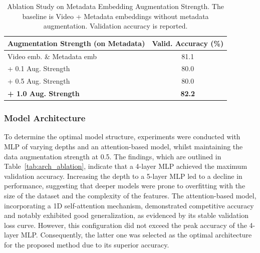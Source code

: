 \begin{table}[hbt!]
\centering
\caption{Ablation Study on Metadata Embedding Augmentation Strength. The baseline is Video + Metadata embeddings without metadata augmentation. Validation accuracy is reported.}
\label{tab:metadata_aug_ablation}
\small
\begin{tabular}{lc}
\toprule
Augmentation Strength (on Metadata) & Valid. Accuracy (\%) \\
\midrule
Video emb. \& Metadata emb & 81.1 \\
+ 0.1 Aug. Strength & 80.0 \\
+ 0.5 Aug. Strength & 80.0 \\
\textbf{+ 1.0 Aug. Strength} & \textbf{82.2} \\
\bottomrule
\end{tabular}
\end{table}

\subsubsection{Model Architecture}


To determine the optimal model structure, experiments were conducted with MLP of varying depths and an attention-based model, whilst maintaining the data augmentation strength at 0.5.
The findings, which are outlined in Table~\ref{tab:arch_ablation}, indicate that a 4-layer MLP achieved the maximum validation accuracy.
Increasing the depth to a 5-layer MLP led to a decline in performance, suggesting that deeper models were prone to overfitting with the size of the dataset and the complexity of the features.
The attention-based model, incorporating a 1D self-attention mechanism, demonstrated competitive accuracy and notably exhibited good generalization, as evidenced by its stable validation loss curve.
However, this configuration did not exceed the peak accuracy of the 4-layer MLP.
Consequently, the latter one was selected as the optimal architecture for the proposed method due to its superior accuracy.


